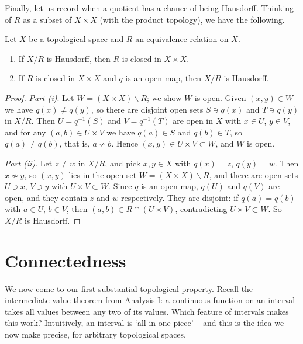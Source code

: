 \documentclass[a4paper]{scrartcl}
\begin{document}
Finally, let us record when a quotient has a chance of being Hausdorff. Thinking of $R$ as a subset of $X \times X$ (with the product topology), we have the following.

\begin{proposition}
    Let $X$ be a topological space and $R$ an equivalence relation on $X$.
    \begin{enumerate}[label=(\roman*)]
        \item If $X/R$ is Hausdorff, then $R$ is closed in $X \times X$.
        \item If $R$ is closed in $X \times X$ and $q$ is an open map, then $X/R$ is Hausdorff.
    \end{enumerate}
\end{proposition}
\begin{proof}
    \emph{Part (i)}. Let $W = (X \times X) \backslash R$; we show $W$ is open. Given $(x, y) \in W$ we have $q(x) \neq q(y)$, so there are disjoint open sets $S \ni q(x)$ and $T \ni q(y)$ in $X/R$. Then $U = q^{-1}(S)$ and $V = q^{-1}(T)$ are open in $X$ with $x \in U$, $y \in V$, and for any $(a, b) \in U \times V$ we have $q(a) \in S$ and $q(b) \in T$, so $q(a) \neq q(b)$, that is, $a \not\sim b$. Hence $(x, y) \in U \times V \subset W$, and $W$ is open.

    \emph{Part (ii)}. Let $z \neq w$ in $X/R$, and pick $x, y \in X$ with $q(x) = z$, $q(y) = w$. Then $x \not\sim y$, so $(x, y)$ lies in the open set $W = (X \times X) \backslash R$, and there are open sets $U \ni x$, $V \ni y$ with $U \times V \subset W$. Since $q$ is an open map, $q(U)$ and $q(V)$ are open, and they contain $z$ and $w$ respectively. They are disjoint: if $q(a) = q(b)$ with $a \in U$, $b \in V$, then $(a, b) \in R \cap (U \times V)$, contradicting $U \times V \subset W$. So $X/R$ is Hausdorff.
\end{proof}

\section{Connectedness}

We now come to our first substantial topological property. Recall the intermediate value theorem from Analysis I: a continuous function on an interval takes all values between any two of its values. Which feature of intervals makes this work? Intuitively, an interval is `all in one piece' -- and this is the idea we now make precise, for arbitrary topological spaces.
\end{document}
